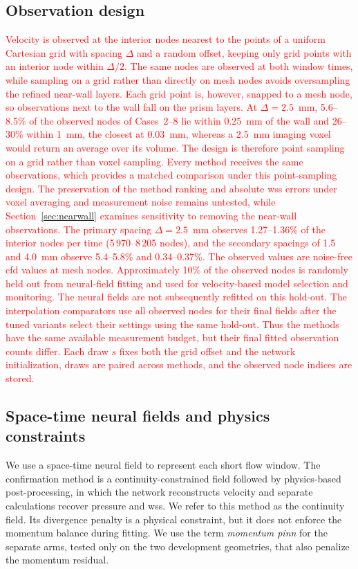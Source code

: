 \documentclass[12pt,a4paper]{article}
\newcommand{\CFD}{\ac{cfd}\xspace}
\newcommand{\PINN}{\ac{pinn}\xspace}
\newcommand{\WSS}{\ac{wss}\xspace}
\theoremstyle{definition}
\numberwithin{equation}{section}
\newcommand{\revision}[1]{\textcolor{red}{#1}}
\begin{document}
\subsection{Observation design}
\label{sec:observations}
\revision{Velocity is observed at the interior nodes nearest to the points of a uniform Cartesian grid with spacing $\Delta$ and a random offset, keeping only grid points with an interior node within $\Delta/2$. The same nodes are observed at both window times, while sampling on a grid rather than directly on mesh nodes avoids oversampling the refined near-wall layers. Each grid point is, however, snapped to a mesh node, so observations next to the wall fall on the prism layers. At $\Delta=2.5$~mm, 5.6--8.5\% of the observed nodes of Cases~2--8 lie within 0.25~mm of the wall and 26--30\% within 1~mm, the closest at 0.03~mm, whereas a 2.5~mm imaging voxel would return an average over its volume. The design is therefore point sampling on a grid rather than voxel sampling. Every method receives the same observations, which provides a matched comparison under this point-sampling design. The preservation of the method ranking and absolute \WSS errors under voxel averaging and measurement noise remains untested, while Section~\ref{sec:nearwall} examines sensitivity to removing the near-wall observations. The primary spacing $\Delta=2.5$~mm observes 1.27--1.36\% of the interior nodes per time (5\,970--8\,205 nodes), and the secondary spacings of 1.5 and 4.0~mm observe 5.4--5.8\% and 0.34--0.37\%. The observed values are noise-free \CFD values at mesh nodes. Approximately 10\% of the observed nodes is randomly held out from neural-field fitting and used for velocity-based model selection and monitoring. The neural fields are not subsequently refitted on this hold-out. The interpolation comparators use all observed nodes for their final fields after the tuned variants select their settings using the same hold-out. Thus the methods have the same available measurement budget, but their final fitted observation counts differ. Each draw $s$ fixes both the grid offset and the network initialization, draws are paired across methods, and the observed node indices are stored.}

\subsection{Space-time neural fields and physics constraints}
\label{sec:field}
We use a space-time neural field to represent each short flow window. The confirmation method is a continuity-constrained field followed by physics-based post-processing, in which the network reconstructs velocity and separate calculations recover pressure and \WSS. We refer to this method as the continuity field. Its divergence penalty is a physical constraint, but it does not enforce the momentum balance during fitting. We use the term \emph{momentum \PINN} for the separate arms, tested only on the two development geometries, that also penalize the momentum residual.
\end{document}
